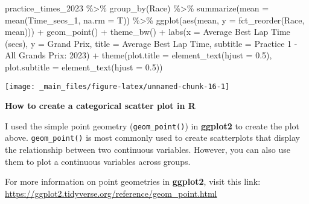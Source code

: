 \documentclass[
]{book}
\newenvironment{Shaded}{\begin{snugshade}}{\end{snugshade}}
\newcommand{\AttributeTok}[1]{\textcolor[rgb]{0.77,0.63,0.00}{#1}}
\newcommand{\FloatTok}[1]{\textcolor[rgb]{0.00,0.00,0.81}{#1}}
\newcommand{\FunctionTok}[1]{\textcolor[rgb]{0.00,0.00,0.00}{#1}}
\newcommand{\NormalTok}[1]{#1}
\newcommand{\SpecialCharTok}[1]{\textcolor[rgb]{0.00,0.00,0.00}{#1}}
\newcommand{\StringTok}[1]{\textcolor[rgb]{0.31,0.60,0.02}{#1}}
\begin{document}
\begin{Shaded}
\begin{Highlighting}[]
\NormalTok{practice\_times\_2023 }\SpecialCharTok{\%\textgreater{}\%}
  \FunctionTok{group\_by}\NormalTok{(Race) }\SpecialCharTok{\%\textgreater{}\%}
  \FunctionTok{summarize}\NormalTok{(}\AttributeTok{mean =} \FunctionTok{mean}\NormalTok{(Time\_secs\_1, }\AttributeTok{na.rm =}\NormalTok{ T)) }\SpecialCharTok{\%\textgreater{}\%}
  \FunctionTok{ggplot}\NormalTok{(}\FunctionTok{aes}\NormalTok{(mean, }\AttributeTok{y =} \FunctionTok{fct\_reorder}\NormalTok{(Race, mean))) }\SpecialCharTok{+}
    \FunctionTok{geom\_point}\NormalTok{() }\SpecialCharTok{+}
    \FunctionTok{theme\_bw}\NormalTok{() }\SpecialCharTok{+}
  \FunctionTok{labs}\NormalTok{(}\AttributeTok{x =} \StringTok{\textquotesingle{}Average Best Lap Time (secs)\textquotesingle{}}\NormalTok{,}
       \AttributeTok{y =} \StringTok{\textquotesingle{}Grand Prix\textquotesingle{}}\NormalTok{,}
       \AttributeTok{title =} \StringTok{\textquotesingle{}Average Best Lap Time\textquotesingle{}}\NormalTok{,}
       \AttributeTok{subtitle =} \StringTok{\textquotesingle{}Practice 1 {-} All Grands Prix: 2023\textquotesingle{}}\NormalTok{) }\SpecialCharTok{+}
  \FunctionTok{theme}\NormalTok{(}\AttributeTok{plot.title =} \FunctionTok{element\_text}\NormalTok{(}\AttributeTok{hjust =} \FloatTok{0.5}\NormalTok{),}
        \AttributeTok{plot.subtitle =} \FunctionTok{element\_text}\NormalTok{(}\AttributeTok{hjust =} \FloatTok{0.5}\NormalTok{))}
\end{Highlighting}
\end{Shaded}

\begin{center}\texttt{[image: \_main\_files/figure-latex/unnamed-chunk-16-1]} \end{center}

\begin{blackbox}

\begin{center}
\textbf{How to create a categorical scatter plot in R}

\end{center}

I used the simple point geometry (\texttt{geom\_point()}) in \textbf{ggplot2} to create the plot above. \texttt{geom\_point()} is most commonly used to create scatterplots that display the relationship between two continuous variables. However, you can also use them to plot a continuous variables across groups.

For more information on point geometries in \textbf{ggplot2}, visit this link: \url{https://ggplot2.tidyverse.org/reference/geom_point.html}

\end{blackbox}
\end{document}
